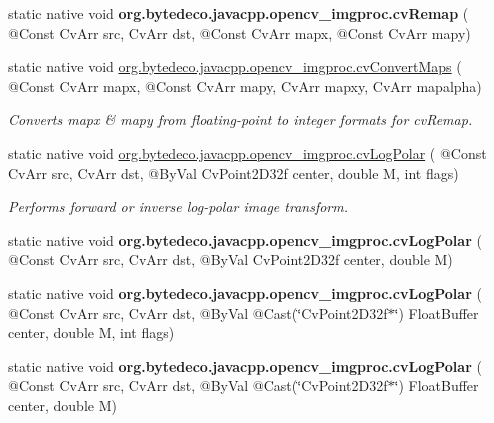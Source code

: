 \begin{DoxyCompactItemize}
\mbox{\label{group__imgproc__c_gacd19a06107f7b19b825b88fc9f277b79}} 
static native void {\bfseries org.\+bytedeco.\+javacpp.\+opencv\+\_\+imgproc.\+cv\+Remap} ( @Const Cv\+Arr src, Cv\+Arr dst, @Const Cv\+Arr mapx, @Const Cv\+Arr mapy)
\item 
static native void \hyperlink{group__imgproc__c_ga9e8c4e8b6609f6bad114d7a6e597d530}{org.\+bytedeco.\+javacpp.\+opencv\+\_\+imgproc.\+cv\+Convert\+Maps} ( @Const Cv\+Arr mapx, @Const Cv\+Arr mapy, Cv\+Arr mapxy, Cv\+Arr mapalpha)
\begin{DoxyCompactList}\small\item\em Converts mapx \& mapy from floating-\/point to integer formats for cv\+Remap. \end{DoxyCompactList}\item 
static native void \hyperlink{group__imgproc__c_gaa181829e06fd0d2f59e112e2a5e27129}{org.\+bytedeco.\+javacpp.\+opencv\+\_\+imgproc.\+cv\+Log\+Polar} ( @Const Cv\+Arr src, Cv\+Arr dst, @By\+Val Cv\+Point2\+D32f center, double M, int flags)
\begin{DoxyCompactList}\small\item\em Performs forward or inverse log-\/polar image transform. \end{DoxyCompactList}\item 
\mbox{\label{group__imgproc__c_ga0544b9fb0414db4c0660eafa03795088}} 
static native void {\bfseries org.\+bytedeco.\+javacpp.\+opencv\+\_\+imgproc.\+cv\+Log\+Polar} ( @Const Cv\+Arr src, Cv\+Arr dst, @By\+Val Cv\+Point2\+D32f center, double M)
\item 
\mbox{\label{group__imgproc__c_ga8eb59d393dd8cbdaa6a1519e5cb0fdc5}} 
static native void {\bfseries org.\+bytedeco.\+javacpp.\+opencv\+\_\+imgproc.\+cv\+Log\+Polar} ( @Const Cv\+Arr src, Cv\+Arr dst, @By\+Val @Cast(\char`\"{}Cv\+Point2\+D32f$\ast$\char`\"{}) Float\+Buffer center, double M, int flags)
\item 
\mbox{\label{group__imgproc__c_ga52473f42d8eeeb7cc84dc135cba18662}} 
static native void {\bfseries org.\+bytedeco.\+javacpp.\+opencv\+\_\+imgproc.\+cv\+Log\+Polar} ( @Const Cv\+Arr src, Cv\+Arr dst, @By\+Val @Cast(\char`\"{}Cv\+Point2\+D32f$\ast$\char`\"{}) Float\+Buffer center, double M)
\item 
\mbox{\label{group__imgproc__c_gaedf9e7989348360c0bc658d93390e40d}} 

\end{DoxyCompactItemize}
